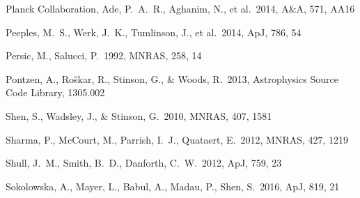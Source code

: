 \documentclass[useAMS,usenatbib]{mn2e}
\def \apj {ApJ}
\def \mnras {MNRAS}
\def \aap {A\&A}
\begin{document}
\begin{thebibliography}{}



  Planck Collaboration, Ade, P.~A.~R., Aghanim, N., et al.\ 2014,
  \aap, 571, AA16 
 
 Peeples, M.~S., Werk, J.~K., Tumlinson, J., et al.\ 2014, \apj, 786, 54


 Persic, M., Salucci, P.\ 1992, \mnras, 258, 14

 Pontzen, A., Ro{\v s}kar, R., Stinson, G., \& Woods, R.\ 2013, Astrophysics Source Code Library, 1305.002 



  


 Shen, S., Wadsley, J., 
\& Stinson, G.\ 2010, \mnras, 407, 1581 

Sharma, P., McCourt, M., Parrish, I.~J., Quataert, E.\ 2012, \mnras, 427, 1219

Shull, J.~M., Smith, B.~D., Danforth, C.~W.\ 2012, \apj, 759, 23

Sokolowska, A., Mayer, L., Babul, A., Madau, P., Shen, S.\ 2016, \apj, 819, 21


\end{thebibliography}
\end{document}
